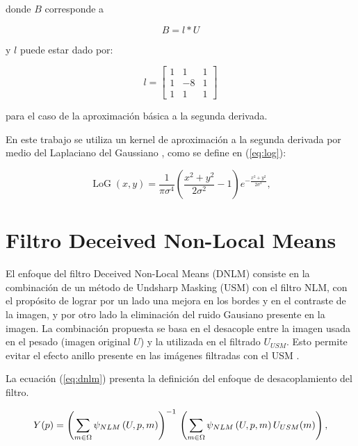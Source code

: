 donde $B$ corresponde a

\begin{equation}
\label{eq:unsharfilter}
B=l*U
\end{equation}

y $l$ puede estar dado por:

\begin{equation} l = \left[
\begin{array}{ccc}
1 & 1 & 1\\
1 & -8 & 1\\
1 & 1 & 1
\end{array}\right]
\end{equation}

para el caso de la aproximaci\'on b\'asica a la segunda derivada.

En este trabajo se utiliza un kernel de aproximaci\'on a la segunda derivada por medio del Laplaciano del Gaussiano \cite{sotak1989laplacian}, como se define en (\ref{eq:log}):

\begin{equation}
\label{eq:log}
\operatorname{LoG}(x,y) = \frac{1}{\pi\sigma^4}\left(\frac{x^2+y^2}{2\sigma^2} - 1\right)e^{-\frac{x^2+y^2}{2\sigma^2}},
\end{equation}



\section{Filtro Deceived Non-Local Means}
\label{ch:marco_dnlm}


El enfoque del filtro Deceived Non-Local Means (DNLM) consiste en la combinaci\'on de un m\'etodo de Undsharp Masking (USM) con el filtro NLM, con el prop\'osito de lograr por un lado una mejora en los bordes y en el contraste de la imagen, y por otro lado la eliminaci\'on del ruido Gausiano  presente en la imagen. La combinaci\'on propuesta se basa en el desacople entre la imagen usada en el pesado (imagen original $U$) y la utilizada en el filtrado $U_{USM}$. Esto permite evitar el efecto anillo presente en las im\'agenes filtradas con el USM \cite{calderon2015dewaff}.

 La ecuaci\'on (\ref{eq:dnlm}) presenta la definici\'on del enfoque de desacoplamiento del filtro.

\begin{equation}
\label{eq:dnlm}
Y(p)=\left(\sum_{m\in \Omega}\psi_{NLM}\left(U, p, m\right)\right)^{-1} \\ \left(\sum_{m\in \Omega}\psi_{NLM}\left(U, p, m\right)U_{USM}(m)\right),
\end{equation}




